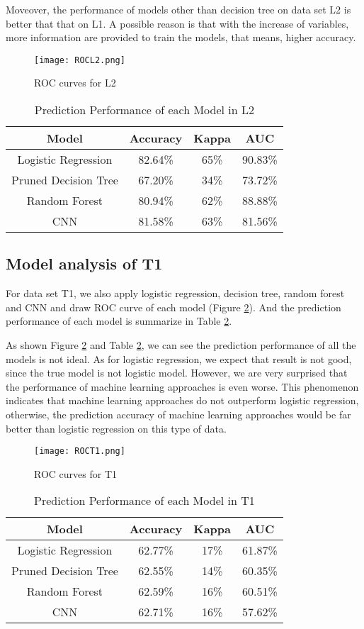 \documentclass[12pt]{article}
\begin{document}
Moveover, the performance of models other than decision tree on data set L2 is better that that on L1. A possible reason is that with the increase of variables, more information are provided to train the models, that means, higher accuracy.
\begin{figure}[!htb]
\centering
\caption{ROC curves for L2}
\label{ROCL2}
\texttt{[image: ROCL2.png]}
\end{figure}
\begin{table}
\centering
\caption{Prediction Performance of each Model in L2}
\label{accuracyL2}
\begin{tabular}{|c|c|c|c|}
\hline
 Model & Accuracy & Kappa & AUC \\
\hline
 Logistic Regression & 82.64\% & 65\% & 90.83\% \\
\hline
 Pruned Decision Tree & 67.20\% & 34\% & 73.72\% \\
\hline
 Random Forest & 80.94\% & 62\% & 88.88\% \\
 \hline
 CNN & 81.58\% & 63\% & 81.56\% \\
\hline
\end{tabular}
\end{table}

\subsection{Model analysis of T1}
For data set T1, we also apply logistic regression, decision tree, random forest and CNN and draw ROC curve of each model (Figure \ref{ROCT1}). And the prediction performance of each model is summarize in Table \ref{accuracyT1}.

As shown Figure \ref{ROCT1} and Table \ref{accuracyT1}, we can see the prediction performance of all the models is not ideal. As for logistic regression, we expect that result is not good, since the true model is not logistic model. However, we are very surprised that the performance of machine learning approaches is even worse. This phenomenon indicates that machine learning approaches do not outperform logistic regression, otherwise, the prediction accuracy of machine learning approaches would be far better than logistic regression on this type of data.
\begin{figure}[!htb]
\centering
\caption{ROC curves for T1}
\label{ROCT1}
\texttt{[image: ROCT1.png]}
\end{figure}
\begin{table}
\centering
\caption{Prediction Performance of each Model in T1}
\label{accuracyT1}
\begin{tabular}{|c|c|c|c|}
\hline
 Model & Accuracy & Kappa & AUC \\
\hline
 Logistic Regression & 62.77\% & 17\% & 61.87\% \\
\hline
 Pruned Decision Tree & 62.55\% & 14\% & 60.35\% \\
\hline
 Random Forest & 62.59\% & 16\% & 60.51\% \\
 \hline
 CNN & 62.71\% & 16\% & 57.62\% \\
\hline
\end{tabular}
\end{table}
\end{document}

